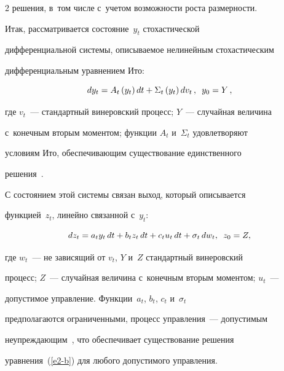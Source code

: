 \begin{multicols}{2}
решения, в~том числе с~учетом возможности роста размерности.


     


     Итак, рассматривается состояние~$y_t$ стохастической 


дифференциальной системы, описываемое нелинейным стохастическим 


дифференциальным уравнением Ито:


     \begin{equation*}


     dy_t=A_t\left( y_t\right) dt+\Sigma_t \left( y_t\right) dv_t\,,\enskip y_0=Y\,,




     \end{equation*}


где $v_t$~--- стандартный винеровский процесс; $Y$~--- случайная величина 


с~конечным вторым моментом; функции $A_t$ и~$\Sigma_t$ удовлетворяют 


условиям Ито, обеспечивающим существование единственного 


решения~\cite{2-b}.





     С состоянием этой системы связан выход, который описывается 


функцией~$z_t$, линейно связанной с~$y_t$:


     \begin{equation}


     dz_t=a_t y_t\,dt+b_t z_t \,dt+c_t u_t \,dt+\sigma_t \,dw_t,\enskip z_0=Z,


     \label{e2-b}


     \end{equation}


где $w_t$~--- не зависящий от $v_t$, $Y$ и~$Z$ стандартный винеровский 


процесс; $Z$~--- случайная величина с~конечным вторым моментом; $u_t$~--- 


допустимое управ\-ле\-ние. Функции~$a_t$, $b_t$, $c_t$ и~$\sigma_t$ 


предполагаются ограниченными, процесс управления~--- допустимым 


неупреждающим~\cite{2-b}, что обеспечивает существование решения 


уравнения~(\ref{e2-b}) для любого допустимого управления.



\end{multicols}
